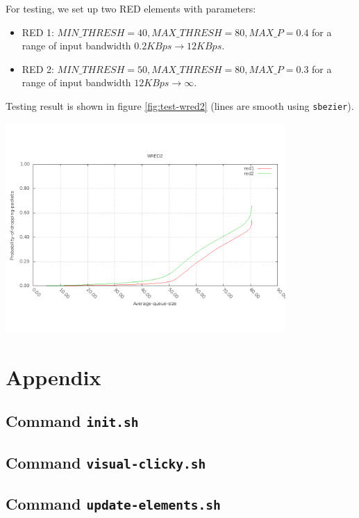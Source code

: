 \documentclass[a4paper]{article}
\begin{document}
  For testing, we set up two RED elements with parameters:
  \begin{itemize}
  	\item RED 1: $MIN\_THRESH = 40, MAX\_THRESH = 80, MAX\_P = 0.4$ for a range of input bandwidth $0.2KBps \to 12KBps$.
  	\item RED 2: $MIN\_THRESH = 50, MAX\_THRESH = 80, MAX\_P = 0.3$ for a range of input bandwidth $12KBps \to \infty$.
  \end{itemize}
  Testing result is shown in figure \ref{fig:test-wred2} (lines are smooth using \texttt{sbezier}).
  \begin{center}
	\includegraphics[width=0.80\textwidth]{wred2.png}
	\label{fig:test-wred2}
  \end{center}
  \newpage
  \appendix
  \section{Appendix}

  \subsection{Command \texttt{init.sh}}
  

  \subsection{Command \texttt{visual-clicky.sh}}
  

  \subsection{Command \texttt{update-elements.sh}}
  
  
\end{document}
